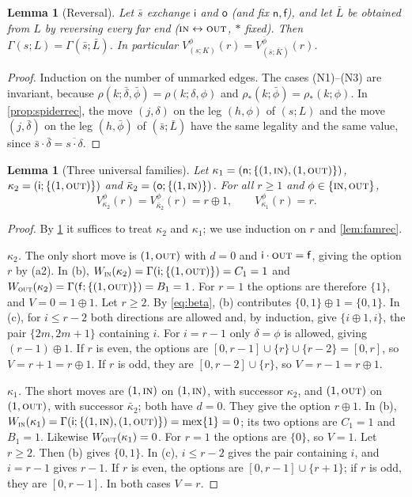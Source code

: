 \documentclass[11pt]{amsart}
\newtheorem{lemma}[theorem]{Lemma}
\theoremstyle{definition}
\theoremstyle{remark}
\newcommand{\mex}{\operatorname{mex}}
\newcommand{\sn}{\mathsf{n}}
\newcommand{\si}{\mathsf{i}}
\newcommand{\so}{\mathsf{o}}
\newcommand{\sff}{\mathsf{f}}
\newcommand{\free}{\ast}
\newcommand{\IN}{\textup{\textsc{in}}}
\newcommand{\OUT}{\textup{\textsc{out}}}
\begin{document}
\begin{lemma}[Reversal]\label{lem:reversal}
Let $\bar s$ exchange $\si$ and $\so$ (and fix $\sn,\sff$), and let $\bar L$ be obtained from $L$ by reversing every far end ($\IN\leftrightarrow\OUT$, $\free$ fixed). Then $\Gamma(s;L)=\Gamma(\bar s;\bar L)$. In particular $V^\phi_{(s;K)}(r)=V^{\bar\phi}_{(\bar s;\bar K)}(r)$.
\end{lemma}

\begin{proof}
Induction on the number of unmarked edges. The cases (N1)--(N3) are invariant, because $\rho(k;\bar\delta,\bar\phi)=\rho(k;\delta,\phi)$ and $\rho_\free(k;\bar\phi)=\rho_\free(k;\phi)$. In \cref{prop:spiderrec}, the move $(j,\delta)$ on the leg $(h,\phi)$ of $(s;L)$ and the move $(j,\bar\delta)$ on the leg $(h,\bar\phi)$ of $(\bar s;\bar L)$ have the same legality and the same value, since $\bar s\cdot\bar\delta=\overline{s\cdot\delta}$.
\end{proof}

\begin{lemma}[Three universal families]\label{lem:universal}
Let $\kappa_1=(\sn;\{(1,\IN),(1,\OUT)\})$, $\kappa_2=(\si;\{(1,\OUT)\})$ and $\bar\kappa_2=(\so;\{(1,\IN)\})$. For all $r\ge1$ and $\phi\in\{\IN,\OUT\}$,
\[
  V^\phi_{\kappa_2}(r)=V^\phi_{\bar\kappa_2}(r)=r\oplus1,\qquad V^\phi_{\kappa_1}(r)=r.
\]
\end{lemma}

\begin{proof}
By \cref{lem:reversal} it suffices to treat $\kappa_2$ and $\kappa_1$; we use induction on $r$ and \cref{lem:famrec}.

\emph{$\kappa_2$.} The only short move is $(1,\OUT)$ with $d=0$ and $\si\cdot\OUT=\sff$, giving the option $r$ by (a2). In (b), $W_\IN(\kappa_2)=\Gamma(\si;\{(1,\OUT)\})=C_1=1$ and $W_\OUT(\kappa_2)=\Gamma(\sff;\{(1,\OUT)\})=B_1=1$. For $r=1$ the options are therefore $\{1\}$, and $V=0=1\oplus1$. Let $r\ge2$. By \eqref{eq:beta}, (b) contributes $\{0,1\}\oplus1=\{0,1\}$. In (c), for $i\le r-2$ both directions are allowed and, by induction, give $\{i\oplus1,i\}$, the pair $\{2m,2m+1\}$ containing $i$. For $i=r-1$ only $\delta=\phi$ is allowed, giving $(r-1)\oplus1$. If $r$ is even, the options are $[0,r-1]\cup\{r\}\cup\{r-2\}=[0,r]$, so $V=r+1=r\oplus1$. If $r$ is odd, they are $[0,r-2]\cup\{r\}$, so $V=r-1=r\oplus 1$.

\emph{$\kappa_1$.} The short moves are $(1,\IN)$ on $(1,\IN)$, with successor $\kappa_2$, and $(1,\OUT)$ on $(1,\OUT)$, with successor $\bar\kappa_2$; both have $d=0$. They give the option $r\oplus1$. In (b), $W_\IN(\kappa_1)=\Gamma(\si;\{(1,\IN),(1,\OUT)\})=\mex\{1\}=0$; its two options are $C_1=1$ and $B_1=1$. Likewise $W_\OUT(\kappa_1)=0$. For $r=1$ the options are $\{0\}$, so $V=1$. Let $r\ge2$. Then (b) gives $\{0,1\}$. In (c), $i\le r-2$ gives the pair containing $i$, and $i=r-1$ gives $r-1$. If $r$ is even, the options are $[0,r-1]\cup\{r+1\}$; if $r$ is odd, they are $[0,r-1]$. In both cases $V=r$.
\end{proof}
\end{document}
